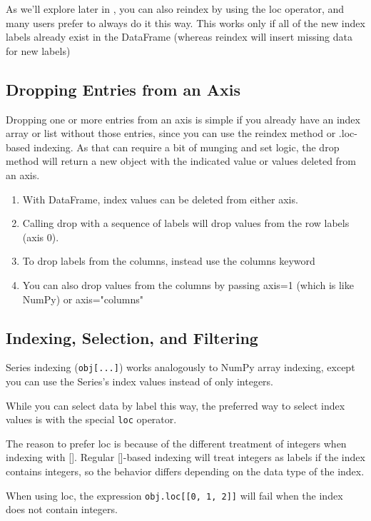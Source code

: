 As we'll explore later in , you
can also reindex by using the loc operator, and many users prefer to always do it this
way. This works only if all of the new index labels already exist in the DataFrame
(whereas reindex will insert missing data for new labels)

\subsection{Dropping Entries from an Axis}
Dropping one or more entries from an axis is simple if you already have an index array or list without those entries, since you can use the reindex method or .loc-based indexing. As that can require a bit of munging and set logic, the drop method will return a new object with the indicated value or values deleted from an axis.

\begin{enumerate}
    \item With DataFrame, index values can be deleted from either axis.
    \item Calling drop with a sequence of labels will drop values from the row labels (axis 0).
    \item To drop labels from the columns, instead use the columns keyword
    \item You can also drop values from the columns by passing axis=1 (which is like NumPy) or axis="columns"
\end{enumerate}


\subsection{Indexing, Selection, and Filtering}
Series indexing (\verb|obj[...]|) works analogously to NumPy array indexing, except you can use the Series's index values instead of only integers.

While you can select data by label this way, the preferred way to select index values is with the special \verb|loc| operator.

The reason to prefer loc is because of the different treatment of integers when indexing with []. Regular []-based indexing will treat integers as labels if the index contains integers, so the behavior differs depending on the data type of the index.


When using loc, the expression \verb|obj.loc[[0, 1, 2]]| will fail when the index does not contain integers.

